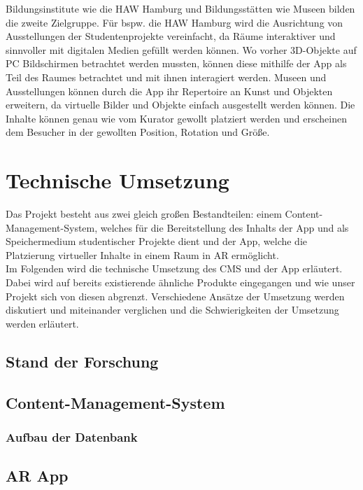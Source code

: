 \documentclass[12pt,a4paper]{article}
\begin{document}
Bildungsinstitute wie die HAW Hamburg und Bildungsstätten wie Museen bilden die zweite Zielgruppe. Für bspw. die HAW Hamburg wird die Ausrichtung von Ausstellungen der Studentenprojekte vereinfacht, da Räume interaktiver und sinnvoller mit digitalen Medien gefüllt werden können. Wo vorher 3D-Objekte auf PC Bildschirmen betrachtet werden mussten, können diese mithilfe der App als Teil des Raumes betrachtet und mit ihnen interagiert werden. Museen und Ausstellungen können durch die App ihr Repertoire an Kunst und Objekten erweitern, da virtuelle Bilder und Objekte einfach ausgestellt werden können. Die Inhalte können genau wie vom Kurator gewollt platziert werden und erscheinen dem Besucher in der gewollten Position, Rotation und Größe.

\section{Technische Umsetzung}
Das Projekt besteht aus zwei gleich großen Bestandteilen: einem Content-Management-System, welches für die Bereitstellung des Inhalts der App und als Speichermedium studentischer Projekte dient und der App, welche die Platzierung virtueller Inhalte in einem Raum in AR ermöglicht.\\
Im Folgenden wird die technische Umsetzung des CMS und der App erläutert. Dabei wird auf bereits existierende ähnliche Produkte eingegangen und wie unser Projekt sich von diesen abgrenzt. Verschiedene Ansätze der Umsetzung werden diskutiert und miteinander verglichen und die Schwierigkeiten der Umsetzung werden erläutert.
\subsection{Stand der Forschung}
\subsection{Content-Management-System}
\subsubsection{Aufbau der Datenbank}
\subsection{AR App}
\end{document}
